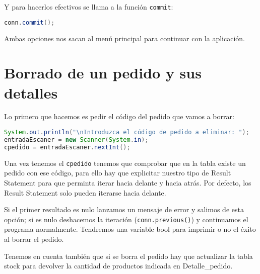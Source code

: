 Y para hacerlos efectivos se llama a la función \texttt{commit}:

\begin{lstlisting}[language=Java]
conn.commit();
\end{lstlisting}

Ambas opciones nos sacan al menú principal para continuar con la aplicación.

\section{Borrado de un pedido y sus detalles}

Lo primero que hacemos es pedir el código del pedido que vamos a borrar:

\begin{lstlisting}[language=Java]
System.out.println("\nIntroduzca el código de pedido a eliminar: ");
entradaEscaner = new Scanner(System.in);
cpedido = entradaEscaner.nextInt();
\end{lstlisting}

Una vez tenemos el \texttt{cpedido} tenemos que comprobar que en la tabla existe un pedido con ese código, para ello hay que explicitar nuestro tipo de Result Statement para que perminta iterar hacia delante y hacia atrás. Por defecto, los Result Statement solo pueden iterarse hacia delante.

Si el primer resultado es nulo lanzamos un mensaje de error y salimos de esta opción; si es nulo deshacemos la iteración (\texttt{conn.previous()}) y continuamos el programa normalmente. Tendremos una variable bool para imprimir o no el éxito al borrar el pedido.

Tenemos en cuenta también que si se borra el pedido hay que actualizar la tabla stock para devolver la cantidad de productos indicada en Detalle\_pedido.

